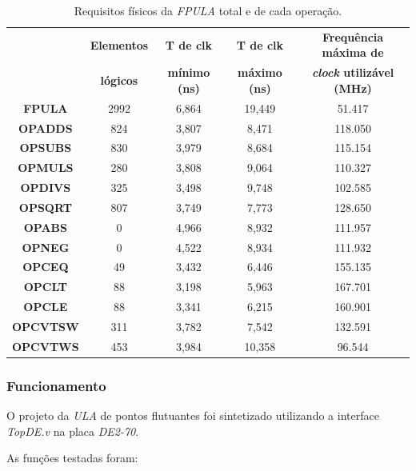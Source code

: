\documentclass[12pt]{article}
\begin{document}
\begin{table}[H]
	\centering
	\begin{tabular}{|c|c|c|c|c|}
		\hline
		& \textbf{Elementos} & \textbf{T de clk} & \textbf{T de clk} &  					\textbf{Frequência máxima de} \\
		& \textbf{lógicos} & \textbf{mínimo (ns)} & \textbf{máximo (ns)} & \textbf{\textit{clock} utilizável (MHz)} \\
		\hline
		\textbf{FPULA} & 2992 & 6,864 & 19,449 & 51.417 \\\hline
		\textbf{OPADDS} & 824 & 3,807 & 8,471 & 118.050 \\\hline
		\textbf{OPSUBS} & 830 & 3,979 & 8,684 & 115.154 \\\hline
		\textbf{OPMULS} & 280 & 3,808 & 9,064 & 110.327 \\\hline
		\textbf{OPDIVS} & 325 & 3,498 & 9,748 & 102.585 \\\hline
		\textbf{OPSQRT} & 807 & 3,749 & 7,773 & 128.650 \\\hline
		\textbf{OPABS} & 0 & 4,966 & 8,932 & 111.957 \\\hline
		\textbf{OPNEG} & 0 & 4,522 & 8,934 & 111.932 \\\hline
		\textbf{OPCEQ} & 49 & 3,432 & 6,446 & 155.135 \\\hline
		\textbf{OPCLT} & 88 & 3,198 & 5,963 & 167.701 \\\hline
		\textbf{OPCLE} & 88 & 3,341 & 6,215 & 160.901 \\\hline
		\textbf{OPCVTSW} & 311 & 3,782 & 7,542 & 132.591 \\\hline
		\textbf{OPCVTWS} & 453 & 3,984 & 10,358 & 96.544 \\\hline
	\end{tabular}
	\caption{Requisitos físicos da \textit{FPULA} total e de cada operação.}
	\label{tab:req3}
\end{table}

\subsubsection{Funcionamento}
\label{subsubsec:fpulafunc}

O projeto da \textit{ULA} de pontos flutuantes foi sintetizado utilizando a interface \textit{TopDE.v} na placa \textit{DE2-70}.

As funções testadas foram:
\end{document}
